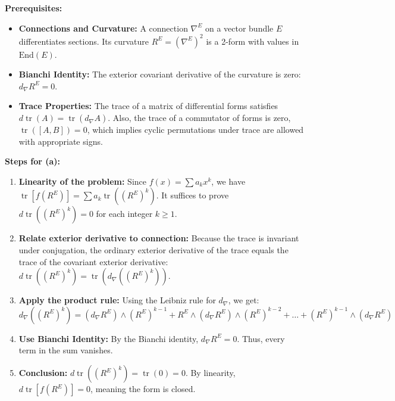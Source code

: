 \begin{solution}
\textbf{Prerequisites:}
\begin{itemize}
    \item \textbf{Connections and Curvature:} A connection $\nabla^E$ on a vector bundle $E$ differentiates sections. Its curvature $R^E = (\nabla^E)^2$ is a 2-form with values in $\text{End}(E)$.
    \item \textbf{Bianchi Identity:} The exterior covariant derivative of the curvature is zero: $d_\nabla R^E = 0$.
    \item \textbf{Trace Properties:} The trace of a matrix of differential forms satisfies $d \operatorname{tr}(A) = \operatorname{tr}(d_\nabla A)$. Also, the trace of a commutator of forms is zero, $\operatorname{tr}([A, B]) = 0$, which implies cyclic permutations under trace are allowed with appropriate signs.
\end{itemize}

\medskip
\textbf{Steps for (a):}
\begin{enumerate}
    \item \textbf{Linearity of the problem:} Since $f(x) = \sum a_k x^k$, we have $\operatorname{tr}[f(R^E)] = \sum a_k \operatorname{tr}((R^E)^k)$. It suffices to prove $d \operatorname{tr}((R^E)^k) = 0$ for each integer $k \ge 1$.
    \item \textbf{Relate exterior derivative to connection:} Because the trace is invariant under conjugation, the ordinary exterior derivative of the trace equals the trace of the covariant exterior derivative: $d \operatorname{tr}((R^E)^k) = \operatorname{tr}(d_\nabla ((R^E)^k))$.
    \item \textbf{Apply the product rule:} Using the Leibniz rule for $d_\nabla$, we get:
    \[
    d_\nabla ((R^E)^k) = (d_\nabla R^E) \wedge (R^E)^{k-1} + R^E \wedge (d_\nabla R^E) \wedge (R^E)^{k-2} + \dots + (R^E)^{k-1} \wedge (d_\nabla R^E)
    \]
    \item \textbf{Use Bianchi Identity:} By the Bianchi identity, $d_\nabla R^E = 0$. Thus, every term in the sum vanishes.
    \item \textbf{Conclusion:} $d \operatorname{tr}((R^E)^k) = \operatorname{tr}(0) = 0$. By linearity, $d \operatorname{tr}[f(R^E)] = 0$, meaning the form is closed.
\end{enumerate}


\end{solution}

